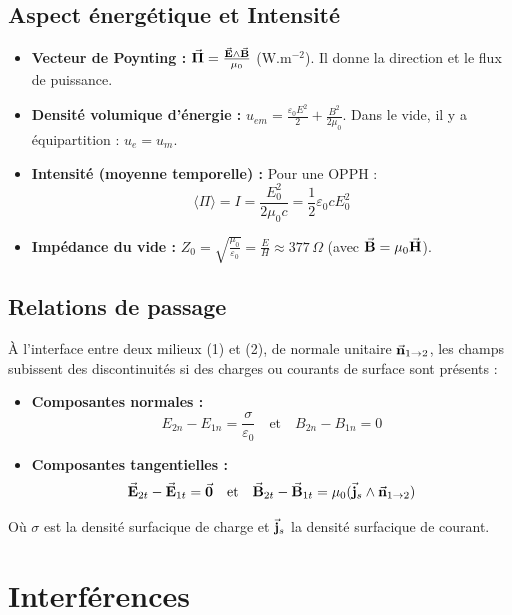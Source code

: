 \documentclass[a4paper,12pt]{article}
\begin{document}
        \subsection{Aspect énergétique et Intensité}
            \begin{itemize}
                \item \textbf{Vecteur de Poynting :} $\va{\Pi} = \frac{\va{E} \wedge \va{B}}{\mu_0}$ (W.m$^{-2}$). Il donne la direction et le flux de puissance.
                \item \textbf{Densité volumique d'énergie :} $u_{em} = \frac{\varepsilon_0 E^2}{2} + \frac{B^2}{2\mu_0}$. Dans le vide, il y a équipartition : $u_e = u_m$.
                \item \textbf{Intensité (moyenne temporelle) :} Pour une OPPH :
                $$ \langle \Pi \rangle = I = \frac{E_0^2}{2\mu_0 c} = \frac{1}{2}\varepsilon_0 c E_0^2 $$
                \item \textbf{Impédance du vide :} $Z_0 = \sqrt{\frac{\mu_0}{\varepsilon_0}} = \frac{E}{H} \approx 377 \, \Omega$ (avec $\va{B} = \mu_0 \va{H}$).
            \end{itemize}

        \subsection{Relations de passage}
            À l'interface entre deux milieux (1) et (2), de normale unitaire $\va{n}_{1 \to 2}$, les champs subissent des discontinuités si des charges ou courants de surface sont présents :
            \begin{itemize}
                \item \textbf{Composantes normales :} 
                $$ E_{2n} - E_{1n} = \frac{\sigma}{\varepsilon_0} \quad \text{et} \quad B_{2n} - B_{1n} = 0 $$
                \item \textbf{Composantes tangentielles :}
                $$ \va{E}_{2t} - \va{E}_{1t} = \va{0} \quad \text{et} \quad \va{B}_{2t} - \va{B}_{1t} = \mu_0 (\va{j}_s \wedge \va{n}_{1 \to 2}) $$
            \end{itemize}
            Où $\sigma$ est la densité surfacique de charge et $\va{j}_s$ la densité surfacique de courant.
    \clearpage

    \section{Interférences}
\end{document}
